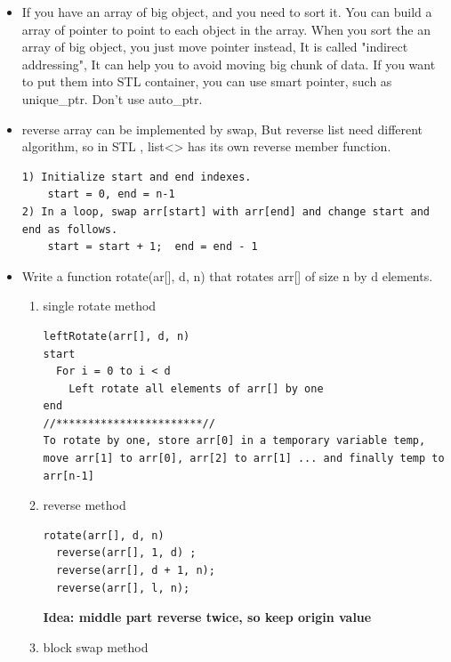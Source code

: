\documentclass[a4paper,12pt,twoside]{book}
\begin{document}
\begin{itemize}
\item If you have an array of big object, and you need to sort it. You can build a array of pointer to point to each object in the array. When you sort the an array of big object,  you just move pointer instead, It is called "indirect addressing", It can help you to avoid moving big chunk of data.  If you want to put them into STL container, you can use smart pointer, such as unique\_ptr. Don't use auto\_ptr. 

\item reverse array can be implemented by swap, But reverse list need different algorithm, so in STL , list<> has its own reverse member function. 
\begin{lstlisting}[breaklines]
1) Initialize start and end indexes. 
	start = 0, end = n-1
2) In a loop, swap arr[start] with arr[end] and change start and end as follows.
	start = start + 1;  end = end - 1
\end{lstlisting}

\item Write a function rotate(ar[], d, n) that rotates arr[] of size n by d elements.
\begin{enumerate}
\item single rotate method
\begin{lstlisting}[breaklines]
leftRotate(arr[], d, n)
start
  For i = 0 to i < d
    Left rotate all elements of arr[] by one
end
//***********************//
To rotate by one, store arr[0] in a temporary variable temp, move arr[1] to arr[0], arr[2] to arr[1] ... and finally temp to arr[n-1]
\end{lstlisting}
\item reverse method
\begin{lstlisting}[breaklines]
rotate(arr[], d, n)
  reverse(arr[], 1, d) ;
  reverse(arr[], d + 1, n);
  reverse(arr[], l, n);
\end{lstlisting}
\textbf{Idea: middle part reverse twice, so keep origin value}

\item block swap method

\end{enumerate}

\end{itemize}
\end{document}
